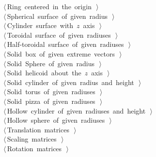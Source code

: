 \documentclass[11pt,oneside]{article}	%
\begin{document}
\begin{flushleft}
\begin{list}{}{}
\mbox{}\verb@@\hbox{$\langle\,$Ring centered in the origin\nobreak\ {\footnotesize {}}$\,\rangle$}\verb@@\\
\mbox{}\verb@@\hbox{$\langle\,$Spherical surface of given radius\nobreak\ {\footnotesize {}}$\,\rangle$}\verb@@\\
\mbox{}\verb@@\hbox{$\langle\,$Cylinder surface with $z$ axis\nobreak\ {\footnotesize {}}$\,\rangle$}\verb@@\\
\mbox{}\verb@@\hbox{$\langle\,$Toroidal surface of given radiuses\nobreak\ {\footnotesize {}}$\,\rangle$}\verb@@\\
\mbox{}\verb@@\hbox{$\langle\,$Half-toroidal surface of given radiuses\nobreak\ {\footnotesize {}}$\,\rangle$}\verb@@\\
\mbox{}\verb@@\hbox{$\langle\,$Solid box of given extreme vectors\nobreak\ {\footnotesize {}}$\,\rangle$}\verb@@\\
\mbox{}\verb@@\hbox{$\langle\,$Solid Sphere of given radius\nobreak\ {\footnotesize {}}$\,\rangle$}\verb@@\\
\mbox{}\verb@@\hbox{$\langle\,$Solid helicoid about the $z$ axis\nobreak\ {\footnotesize {}}$\,\rangle$}\verb@@\\
\mbox{}\verb@@\hbox{$\langle\,$Solid cylinder of given radius and height\nobreak\ {\footnotesize {}}$\,\rangle$}\verb@@\\
\mbox{}\verb@@\hbox{$\langle\,$Solid torus of given radiuses\nobreak\ {\footnotesize {}}$\,\rangle$}\verb@@\\
\mbox{}\verb@@\hbox{$\langle\,$Solid pizza of given radiuses\nobreak\ {\footnotesize {}}$\,\rangle$}\verb@@\\
\mbox{}\verb@@\hbox{$\langle\,$Hollow cylinder of given radiuses and height\nobreak\ {\footnotesize {}}$\,\rangle$}\verb@@\\
\mbox{}\verb@@\hbox{$\langle\,$Hollow sphere of given radiuses\nobreak\ {\footnotesize {}}$\,\rangle$}\verb@@\\
\mbox{}\verb@@\hbox{$\langle\,$Translation matrices\nobreak\ {\footnotesize {}}$\,\rangle$}\verb@@\\
\mbox{}\verb@@\hbox{$\langle\,$Scaling matrices\nobreak\ {\footnotesize {}}$\,\rangle$}\verb@@\\
\mbox{}\verb@@\hbox{$\langle\,$Rotation matrices\nobreak\ {\footnotesize {}}$\,\rangle$}\verb@@\\

\end{list}
\end{flushleft}
\end{document}
